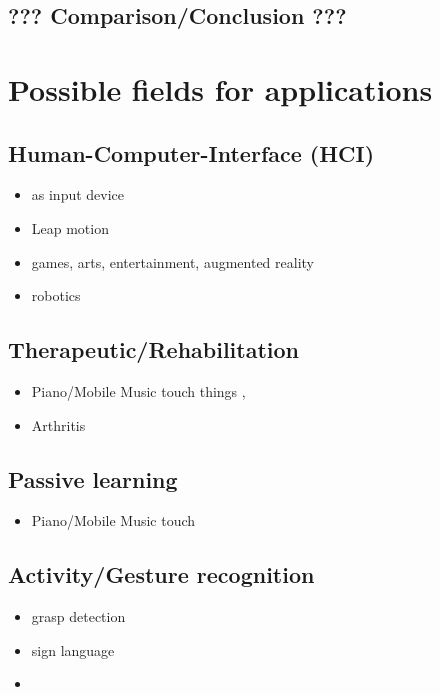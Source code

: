 \subsection{??? Comparison/Conclusion ???}



\section{Possible fields for applications}

\subsection{Human-Computer-Interface (HCI)}
\begin{itemize}
\item as input device
\item Leap motion
\item games, arts, entertainment, augmented reality
\item robotics \cite{zecca2007development}
\end{itemize}

\subsection{Therapeutic/Rehabilitation}
\begin{itemize}
\item Piano/Mobile Music touch things \cite{huang2010mobile}, \cite{huang2008pianotouch}
\item Arthritis \cite{o2013novel}

\end{itemize}

\subsection{Passive learning}
\begin{itemize}
\item Piano/Mobile Music touch
\end{itemize}

\subsection{Activity/Gesture recognition}

\begin{itemize}
\item grasp detection \cite{supuk2008evaluation}
\item sign language
\item \cite{zhang2011framework}

\end{itemize}



